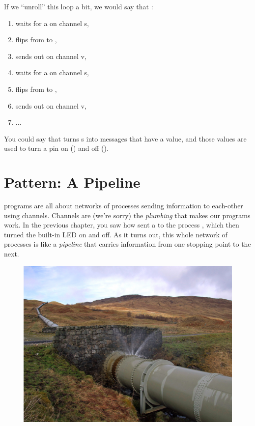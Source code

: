 If we ``unroll'' this loop a bit, we would say that \toggle:

\vspace{3mm}
\begin{enumerate}
	\item waits for a \SIGNALT on channel {\code s},
	\item flips from \LOW to \HIGH,
	\item sends \HIGH out on channel {\code v},
	\item waits for a \SIGNALT on channel {\code s},
	\item flips from \HIGH to \LOW,
	\item sends \LOW out on channel {\code v},
	\item ...
\end{enumerate}

You could say that \toggle turns {\SIGNALT}s into messages that have a value, and those values are used to turn a pin on (\HIGH) and off (\LOW).

\newpage

\section{Pattern: A Pipeline}
\plumbing programs are all about networks of processes sending information to each-other using channels. Channels are (we're sorry) the {\em plumbing} that makes our programs work. In the previous chapter, you saw how \bp sent a \SIGNALV to the process \tp, which then turned the built-in LED on and off. As it turns out, this whole network of processes is like a {\em pipeline} that carries information from one stopping point to the next.

\vspace{3mm}
\begin{figure}[!ht]
  \begin{center}
    \includegraphics[width=\linewidth]{images/scotland-pipeline}
    \label{image:scotland-pipeline}
  \end{center}
\end{figure}


